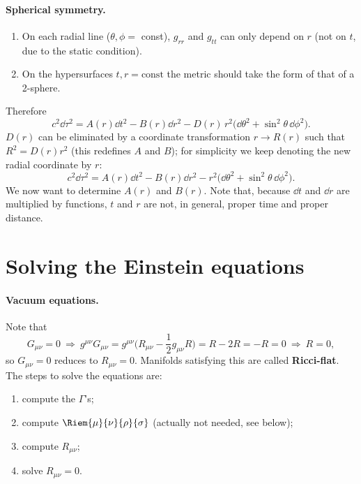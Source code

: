 \paragraph{Spherical symmetry.}
\begin{enumerate}[label=(\roman*),nosep]
\item On each radial line ($\theta,\phi=$ const), $g_{rr}$ and $g_{tt}$ can only depend on $r$ (not on $t$, due to the static condition).
\item On the hypersurfaces $t,r=\text{const}$ the metric should take the form of that of a 2-sphere.
\end{enumerate}
Therefore
\[
  c^2\dd\tau^2=A(r)\dd t^2-B(r)\dd r^2-D(r)\,r^2\big(\dd\theta^2+\sin^2\theta\,\dd\phi^2\big).
\]
$D(r)$ can be eliminated by a coordinate transformation $r\to R(r)$ such that $R^2=D(r)r^2$ (this redefines $A$ and $B$); for simplicity we keep denoting the new radial coordinate by $r$:
\begin{equation}
  c^2\dd\tau^2=A(r)\dd t^2-B(r)\dd r^2-r^2\big(\dd\theta^2+\sin^2\theta\,\dd\phi^2\big).
  \label{eq:schw-ansatz}
\end{equation}
We now want to determine $A(r)$ and $B(r)$. Note that, because $\dd t$ and $\dd r$ are multiplied by functions, $t$ and $r$ are not, in general, proper time and proper distance.

\section{Solving the Einstein equations}

\paragraph{Vacuum equations.} Note that
\[
  G_{\mu\nu}=0\ \Rightarrow\ g^{\mu\nu}G_{\mu\nu}=g^{\mu\nu}\Big(R_{\mu\nu}-\frac12g_{\mu\nu}R\Big)=R-2R=-R=0\ \Rightarrow\ R=0 ,
\]
so $G_{\mu\nu}=0$ reduces to $\boxed{R_{\mu\nu}=0}$. Manifolds satisfying this are called \textbf{Ricci-flat}. The steps to solve the equations are:
\begin{enumerate}[nosep]
\item compute the $\Gamma$'s;
\item compute $\Riem{\mu}{\nu}{\rho}{\sigma}$ (actually not needed, see below);
\item compute $R_{\mu\nu}$;
\item solve $R_{\mu\nu}=0$.
\end{enumerate}

